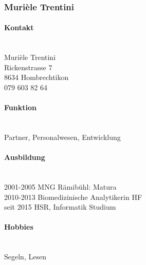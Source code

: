 \subsubsection{Murièle Trentini}
\noindent\begin{minipage}{0.7\textwidth}
	\paragraph{Kontakt} \hfill \\
	Murièle Trentini \\
	Rickenstrasse 7 \\
	8634 Hombrechtikon \\
	079 603 82 64 \\
	
	\paragraph{Funktion} \hfill \\
	Partner, Personalwesen, Entwicklung \\
	
	\paragraph{Ausbildung} \hfill \\
	2001-2005 \hspace{2cm} MNG Rämibühl: Matura \\
	2010-2013 \hspace{2cm} Biomedizinische Analytikerin HF \\
	seit 2015\hspace{2.3cm} HSR, Informatik Studium\\
	
	\paragraph{Hobbies} \hfill \\
	Segeln, Lesen \\
\end{minipage}
\hfill
